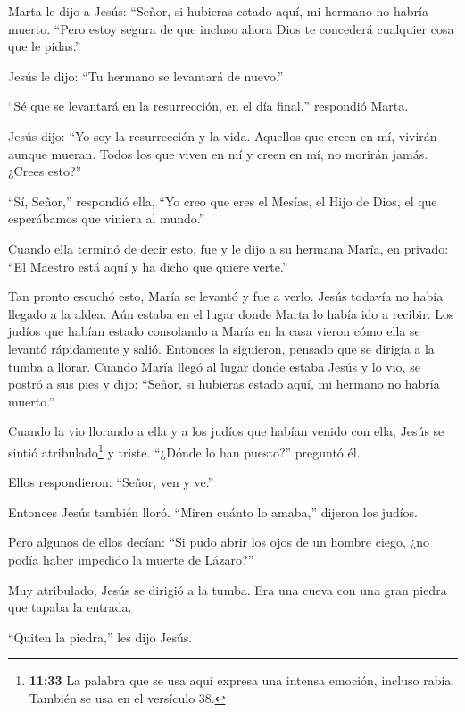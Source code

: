  Marta le dijo a Jesús: ``Señor, si hubieras estado aquí,
mi hermano no habría muerto.  ``Pero estoy segura de que
incluso ahora Dios te concederá cualquier cosa que le pidas.''

 Jesús le dijo: ``Tu hermano se levantará de nuevo.''

 ``Sé que se levantará en la resurrección, en el día
final,'' respondió Marta.

 Jesús dijo: ``Yo soy la resurrección y la vida. Aquellos
que creen en mí, vivirán aunque mueran.  Todos los que
viven en mí y creen en mí, no morirán jamás. ¿Crees esto?''

 ``Sí, Señor,'' respondió ella, ``Yo creo que eres el
Mesías, el Hijo de Dios, el que esperábamos que viniera al mundo.''

 Cuando ella terminó de decir esto, fue y le dijo a su
hermana María, en privado: ``El Maestro está aquí y ha dicho que quiere
verte.''

 Tan pronto escuchó esto, María se levantó y fue a verlo.
 Jesús todavía no había llegado a la aldea. Aún estaba en
el lugar donde Marta lo había ido a recibir.  Los judíos
que habían estado consolando a María en la casa vieron cómo ella se
levantó rápidamente y salió. Entonces la siguieron, pensado que se
dirigía a la tumba a llorar.  Cuando María llegó al lugar
donde estaba Jesús y lo vio, se postró a sus pies y dijo: ``Señor, si
hubieras estado aquí, mi hermano no habría muerto.''

 Cuando la vio llorando a ella y a los judíos que habían
venido con ella, Jesús se sintió atribulado\footnote{\textbf{11:33} La
  palabra que se usa aquí expresa una intensa emoción, incluso rabia.
  También se usa en el versículo 38.} y triste.  ``¿Dónde
lo han puesto?'' preguntó él.

Ellos respondieron: ``Señor, ven y ve.''

 Entonces Jesús también lloró.  ``Miren cuánto
lo amaba,'' dijeron los judíos.

 Pero algunos de ellos decían: ``Si pudo abrir los ojos de
un hombre ciego, ¿no podía haber impedido la muerte de Lázaro?''

 Muy atribulado, Jesús se dirigió a la tumba. Era una cueva
con una gran piedra que tapaba la entrada.

 ``Quiten la piedra,'' les dijo Jesús.

